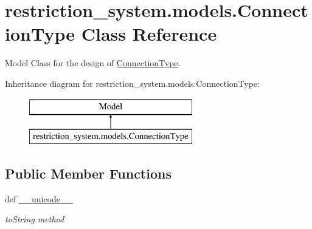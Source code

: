 \hypertarget{classrestriction__system_1_1models_1_1ConnectionType}{}\section{restriction\+\_\+system.\+models.\+Connection\+Type Class Reference}
\label{classrestriction__system_1_1models_1_1ConnectionType}


Model Class for the design of \hyperlink{classrestriction__system_1_1models_1_1ConnectionType}{Connection\+Type}.  


Inheritance diagram for restriction\+\_\+system.\+models.\+Connection\+Type\+:\begin{figure}[H]
\begin{center}
\leavevmode
\includegraphics[height=2.000000cm]{classrestriction__system_1_1models_1_1ConnectionType}
\end{center}
\end{figure}
\subsection*{Public Member Functions}
\begin{DoxyCompactItemize}
\item 
def \hyperlink{classrestriction__system_1_1models_1_1ConnectionType_adb44bcf0372bbb9d76ecde6b7dacded4}{\+\_\+\+\_\+unicode\+\_\+\+\_\+}
\begin{DoxyCompactList}\small\item\em to\+String method \end{DoxyCompactList}\end{DoxyCompactItemize}
